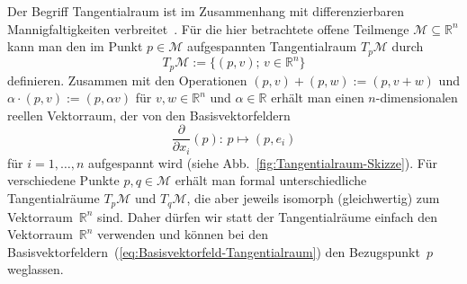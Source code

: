 \begin{remark}
[Tangentialraum]\label{rem:tangentialraum}Der Begriff Tangentialraum
ist im Zusammenhang mit differenzierbaren Mannigfaltigkeiten verbreitet~\cite{abraham1983,jaenich2005,lee2006}.
Für die hier betrachtete offene Teilmenge $\mathcal{M}\subseteq{\mathbb{R}}^{n}$
kann man den im Punkt $p\in\mathcal{M}$ aufgespannten Tangentialraum
$T_{p}\mathcal{M}$ durch
\[
T_{p}\mathcal{M}:=\{(p,v);\,v\in{\mathbb{R}}^{n}\}
\]
definieren. Zusammen mit den Operationen $(p,v)+(p,w):=(p,v+w)$ und
$\alpha\cdot(p,v):=(p,\alpha v)$ für $v,w\in{\mathbb{R}}^{n}$ und $\alpha\in{\mathbb{R}}$
erhält man einen $n$-dimensionalen reellen Vektorraum, der von den
Basisvektorfeldern
\begin{equation}
\frac{\partial}{\partial x_{i}}(p):\,p\mapsto(p,e_{i})\label{eq:Basisvektorfeld-Tangentialraum}
\end{equation}
für $i=1,\ldots,n$ aufgespannt wird (siehe Abb.~\ref{fig:Tangentialraum-Skizze}).
Für verschiedene Punkte $p,q\in\mathcal{M}$ erhält man formal unterschiedliche
Tangentialräume $T_{p}\mathcal{M}$ und $T_{q}\mathcal{M}$, die aber
jeweils isomorph (gleichwertig) zum Vektorraum~${\mathbb{R}}^{n}$ sind. Daher
dürfen wir statt der Tangentialräume einfach den Vektor\-raum~${\mathbb{R}}^{n}$
verwenden und können bei den Basisvektorfeldern~(\ref{eq:Basisvektorfeld-Tangentialraum})
den Bezugspunkt~$p$ weglassen.
\end{remark}


